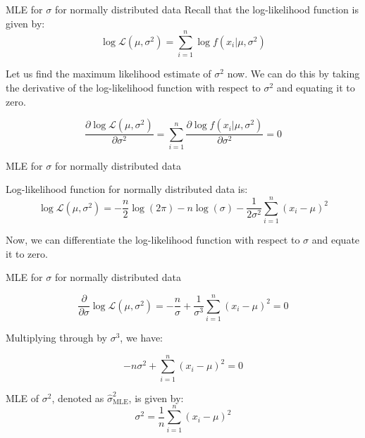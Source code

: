 \documentclass[handout]{beamer}
\begin{document}
\begin{frame}{MLE for $\sigma$ for normally distributed data}
    Recall that the log-likelihood function is given by:
    \begin{equation}
        \log \mathcal{L}(\mu, \sigma^2) = \sum_{i=1}^n \log f(x_i|\mu, \sigma^2)
    \end{equation}

    Let us find the maximum likelihood estimate of $\sigma^2$ now. We can do this by taking the derivative of the log-likelihood function with respect to $\sigma^2$ and equating it to zero.   

    \begin{equation}
        \frac{\partial \log \mathcal{L}(\mu, \sigma^2)}{\partial \sigma^2} = \sum_{i=1}^n \frac{\partial \log f(x_i|\mu, \sigma^2)}{\partial \sigma^2} = 0
    \end{equation}
    
\end{frame}

\begin{frame}{MLE for $\sigma$ for normally distributed data}
    \begin{tcolorbox}[colback=metropolisblue!5,colframe=metropolisblue,title=Log Likelihood Function for Univariate Normal Distribution]
        Log-likelihood function for normally distributed data is:
        \[
            \log \mathcal{L}(\mu, \sigma^2) = -\frac{n}{2} \log(2\pi) - n\log(\sigma) - \frac{1}{2\sigma^2} \sum_{i=1}^n (x_i-\mu)^2
            \]
    \end{tcolorbox}

Now, we can differentiate the log-likelihood function with respect to $\sigma$ and equate it to zero.
\end{frame}

\begin{frame}{MLE for $\sigma$ for normally distributed data}

    
        \[
        \frac{{\partial}}{{\partial \sigma}} \log \mathcal{L}(\mu, \sigma^2) = -\frac{n}{\sigma} + \frac{1}{\sigma^3} \sum_{i=1}^n (x_i-\mu)^2 = 0
        \]
    
        Multiplying through by $\sigma^3$, we have:
    
        \[
        -n \sigma^2 + \sum_{i=1}^n (x_i-\mu)^2 = 0
        \]
    
        \begin{tcolorbox}[colback=metropolisblue!5,colframe=metropolisblue,title=Maximum Likelihood Estimate for $\sigma^2$]
            MLE of $\sigma^2$, denoted as $\hat{\sigma}^2_{\text{MLE}}$, is given by:
            \[
                \sigma^2 = \frac{1}{n} \sum_{i=1}^n (x_i-\mu)^2
                \]
        \end{tcolorbox}
    
       

    \end{frame}
\end{document}
